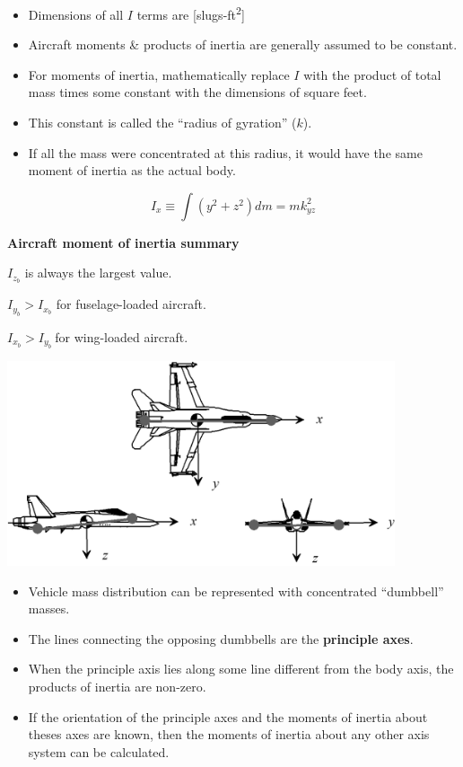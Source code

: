 \documentclass[
]{book}
\providecommand{\tightlist}{%
  \setlength{\itemsep}{0pt}\setlength{\parskip}{0pt}}
\begin{document}
\begin{itemize}
\tightlist
\item
  Dimensions of all \(I\) terms are {[}slugs-ft\textsuperscript{2}{]}
\item
  Aircraft moments \& products of inertia are generally assumed to be constant.
\item
  For moments of inertia, mathematically replace \(I\) with the product of total mass times some constant with the dimensions of square feet.
\item
  This constant is called the ``radius of gyration'' (\(k\)).
\item
  If all the mass were concentrated at this radius, it would have the same moment of inertia as the actual body.
\end{itemize}

\[ I_x \equiv \int \left( y^2 + z^2 \right) dm = mk^2_{yz} \]

\textbf{Aircraft moment of inertia summary}

\(I_{z_b}\) is always the largest value.

\(I_{y_b} > I_{x_b}\) for fuselage-loaded aircraft.

\(I_{x_b} > I_{y_b}\ \)for wing-loaded aircraft.

\includegraphics[width=4.5in,height=2.375in]{media/07/image19.png}

\begin{itemize}
\tightlist
\item
  Vehicle mass distribution can be represented with concentrated ``dumbbell'' masses.
\item
  The lines connecting the opposing dumbbells are the \textbf{principle axes}.
\item
  When the principle axis lies along some line different from the body axis, the products of inertia are non-zero.
\item
  If the orientation of the principle axes and the moments of inertia about theses axes are known, then the moments of inertia about any other axis system can be calculated.
\end{itemize}
\end{document}

